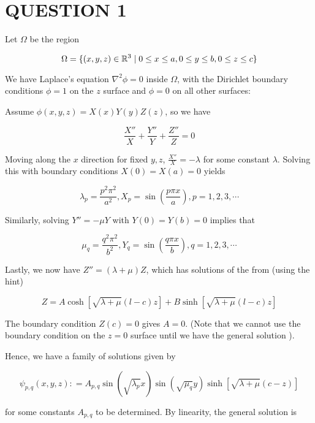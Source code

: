\documentclass[a4paper]{article}
\begin{document}
	
\maketitle

\section{QUESTION 1}


Let $ \Omega $ be the region

\[ \Omega = \{  (x,y,z) \in \mathbb{R}^{3} \; | \; 0 \leq x \leq a, 0 \leq y \leq b, 0 \leq z \leq c  \} \]

We have Laplace's equation $ \nabla^{2} \phi = 0 $ inside $ \Omega $, with the Dirichlet boundary conditions $ \phi = 1 $ on the $ z $ surface and $ \phi = 0 $ on all other surfaces:

Assume $ \phi(x,y,z) = X(x) Y(y) Z(z) $, so we have

\[ \frac{X''}{X} + \frac{Y''}{Y} + \frac{Z''}{Z} = 0 \]

Moving along the $ x $ direction for fixed $ y,z $, $ \frac{X''}{X} = - \lambda $ for some constant $ \lambda $. Solving this with boundary conditions $ X(0) = X(a) = 0 $ yields

\[ \lambda_{p} = \frac{p^{2} \pi^{2}}{a^{2}}, X_{p} = \sin \left( \frac{p \pi x}{a} \right), p = 1,2,3,\cdots  \]

Similarly, solving $ Y'' = - \mu Y  $ with $ Y(0) = Y(b) = 0 $ implies that

\[ \mu_{q} = \frac{q^{2} \pi^{2}}{b^{2}}, Y_{q} =  \sin \left(  \frac{q \pi x}{b} \right), q = 1,2,3,\cdots  \]

Lastly, we now have $ Z'' = (\lambda + \mu) Z $, which has solutions of the from (using the hint)

\[ Z = A \cosh \left[  \sqrt{\lambda + \mu}(l - c)z \right]  + B \sinh \left[   \sqrt{\lambda + \mu}(l - c)z   \right]    \]

The boundary condition $ Z(c) = 0 $ gives $ A = 0 $. (Note that we cannot use the boundary condition on the $ z = 0 $ surface until we have the general solution ).

Hence, we have a family of solutions given by


\[ \psi_{p,q}(x,y,z) : = A_{p,q} \sin \left(  \sqrt{\lambda_{p}} x \right) \sin \left(  \sqrt{\mu_{q}} y \right)  \sinh \left[  \sqrt{\lambda + \mu}(c - z)    \right]  \]

for some constants $ A_{p,q} $ to be determined. By linearity, the general solution is
\end{document}
